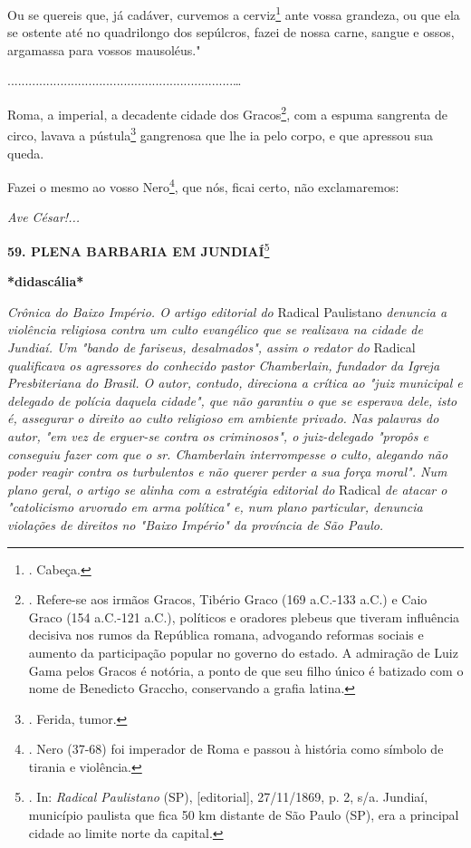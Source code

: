Ou se quereis que, já cadáver, curvemos a cerviz\footnote{. Cabeça.}
ante vossa grandeza, ou que ela se ostente até no quadrilongo dos
sepúlcros, fazei de nossa carne, sangue e ossos, argamassa para vossos
mausoléus."

................................................................\ldots{}

Roma, a imperial, a decadente cidade dos Gracos\footnote{. Refere-se aos
  irmãos Gracos, Tibério Graco (169 a.C.-133 a.C.) e Caio Graco (154
  a.C.-121 a.C.), políticos e oradores plebeus que tiveram influência
  decisiva nos rumos da República romana, advogando reformas sociais e
  aumento da participação popular no governo do estado. A admiração de
  Luiz Gama pelos Gracos é notória, a ponto de que seu filho único é
  batizado com o nome de Benedicto Graccho, conservando a grafia latina.},
com a espuma sangrenta de circo, lavava a pústula\footnote{. Ferida,
  tumor.} gangrenosa que lhe ia pelo corpo, e que apressou sua queda.

Fazei o mesmo ao vosso Nero\footnote{. Nero (37-68) foi imperador de
  Roma e passou à história como símbolo de tirania e violência.}, que
nós, ficai certo, não exclamaremos:

\emph{Ave César!...}

\textbf{59. PLENA BARBARIA EM JUNDIAÍ}\footnote{. In: \emph{Radical
  Paulistano} (SP), {[}editorial{]}, 27/11/1869, p. 2, s/a. Jundiaí,
  município paulista que fica 50 km distante de São Paulo (SP), era a
  principal cidade ao limite norte da capital.}

\textbf{*didascália*}

\emph{Crônica do Baixo Império. O artigo editorial do} Radical
Paulistano \emph{denuncia a violência religiosa contra um culto
evangélico que se realizava na cidade de Jundiaí. Um "bando de fariseus,
desalmados", assim o redator do} Radical \emph{qualificava os agressores
do conhecido pastor Chamberlain, fundador da Igreja Presbiteriana do
Brasil. O autor, contudo, direciona a crítica ao "juiz municipal e
delegado de polícia daquela cidade", que não garantiu o que se esperava
dele, isto é, assegurar o direito ao culto religioso em ambiente
privado. Nas palavras do autor, "em vez de erguer-se contra os
criminosos", o juiz-delegado "propôs e conseguiu fazer com que o sr.
Chamberlain interrompesse o culto, alegando não poder reagir contra os
turbulentos e não querer perder a sua força moral". Num plano geral, o
artigo se alinha com a estratégia editorial do} Radical \emph{de atacar
o "catolicismo arvorado em arma política" e, num plano particular,
denuncia violações de direitos no "Baixo Império" da província de São
Paulo.}

